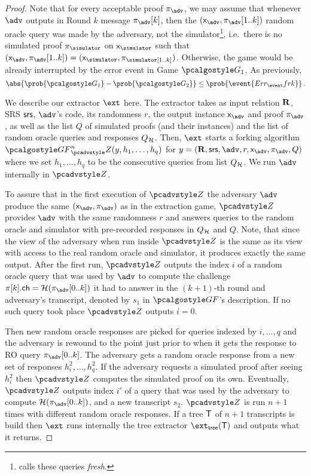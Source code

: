 \documentclass[runningheads,11pt]{llncs}
\begin{document}
\begin{proof}
   Note that for every acceptable proof
  $\zkproof_{\advse}$, we may assume that whenever $\advse$ outputs in Round $k$
  message $\zkproof_{\advse}[k]$, then the
  $(\inp_{\advse}, \zkproof_{\advse}[1..k])$ random oracle query was made
  by the adversary, not the simulator\footnote{\cite{INDOCRYPT:FKMV12} calls
    these queries \emph{fresh}.}, i.e.~there is no simulated proof
  $\zkproof_\simulator$ on $\inp_\simulator$ such that
  $(\inp_{\advse}, \zkproof_{\advse} [1..k]) = (\inp_\simulator,
  \zkproof_\simulator[1..k])$. Otherwise, the game would be already interrupted
  by the error event in Game $\game{1}$.  As previously,
\[
  \abs{\prob{\game{1}} - \prob{\game{2}}} \leq \prob{\event{\errfrk}}\,.
\]

We describe our extractor $\ext$ here. The extractor takes as input relation
$\mathbf{R}$, SRS $\mathsf{srs}$, $\advse$'s code, its randomness $r$, the output instance
$\inp_{\advse}$ and proof $\zkproof_{\advse}$, as well as the list $Q$ of
simulated proofs (and their instances) and the list of random oracle queries and
responses $Q_{\mathcal{H}}$. Then, $\ext$ starts a forking algorithm
$\genforking^{n}_\zdv(y,h_1, \ldots, h_q)$ for
$y = (\REL, \srs, \advse, r, \inp_{\advse}, \zkproof_{\advse}, Q)$ where we set
$h_1, \ldots, h_q$ to be the consecutive queries from list $Q_{\mathcal{H}}$. We run
$\advse$ internally in $\zdv$.%

To assure that in the first execution of $\zdv$ the adversary $\advse$ produce
the same $(\inp_{\advse}, \zkproof_{\advse})$ as in the extraction game, $\zdv$
provides $\advse$ with the same randomness $r$ and answers queries to the random
oracle and simulator with pre-recorded responses in $Q_{\mathcal{H}}$ and $Q$.
%
Note, that since the view of the adversary when run inside $\zdv$ is the same as its
view with access to the real random oracle and simulator, it produces exactly the
same output. After the first run, $\zdv$ outputs the index $i$ of a random oracle
query that was used by $\advse$ to compute the challenge $\zkproof[k].\ch =
\ro(\zkproof_{\advse}[0..k])$ it had to answer in the $(k + 1)$-th round and
adversary's transcript, denoted by $s_1$ in $\genforking$'s description. If no
such query took place $\zdv$ outputs $i = 0$.

Then new random oracle responses are picked for queries indexed by
$i, \ldots, q$ and the adversary is rewound to the point just prior to when it gets the
response to RO query $\zkproof_{\advse}[0..k]$. The adversary gets a random
oracle response from a new set of responses $h^2_i, \ldots, h^2_q$. If the
adversary requests a simulated proof after seeing $h^2_i$ then $\zdv$ computes
the simulated proof on its own. Eventually, $\zdv$ outputs index $i'$ of a query
that was used by the adversary to compute $\ro(\zkproof_{\advse}[0..k])$, and a
new transcript $s_2$. $\zdv$ is run $n + 1$ times with different random oracle
responses. If a tree $\mathsf{T}$ of $n + 1$ transcripts is build then $\ext$
runs internally the tree extractor $\extt(\tree)$ and outputs what it returns.


\end{proof}
\end{document}
